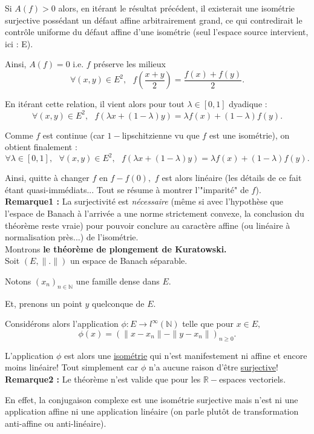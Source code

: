 Si $A(f)>0$ alors, en itérant le résultat précédent, il existerait une isométrie surjective possédant un défaut affine arbitrairement grand, ce qui contredirait le contrôle uniforme du défaut affine d'une isométrie (seul l'espace source intervient, ici : E).

Ainsi, $A(f)=0$ i.e. $f$ préserve les milieux $$\forall (x,y)\in E^{2},\mbox{ } f(\frac{x+y}{2})=\frac{f(x)+f(y)}{2}.$$

En itérant cette relation, il vient alors pour tout $\lambda\in[0,1]$ dyadique : $$\forall (x,y)\in E^{2},\mbox{ } f(\lambda x + (1-\lambda)y)=\lambda f(x)+(1-\lambda)f(y).$$

Comme $f$ est continue (car $1-$lipschitzienne vu que $f$ est une isométrie), on obtient finalement : $$\forall\lambda\in[0,1],\mbox{ }\forall (x,y)\in E^{2},\mbox{ } f(\lambda x + (1-\lambda)y)=\lambda f(x)+(1-\lambda)f(y).$$

Ainsi, quitte à changer $f$ en $f-f(0),$ $f$ est alors linéaire (les détails de ce fait étant quasi-immédiats... Tout se résume à montrer l'"imparité" de $f$).\\


\textbf{Remarque1 :} La surjectivité est \emph{nécessaire} (même si avec l'hypothèse que l'espace de Banach à l'arrivée a une norme strictement convexe, la conclusion du théorème reste vraie) pour pouvoir conclure au caractère affine (ou linéaire à normalisation près...) de l'isométrie.\\

Montrons \textbf{le théorème de plongement de Kuratowski.}\\

Soit $(E,\|.\|)$ un espace de Banach séparable.

Notons $(x_{n})_{n\in\mathbb{N}}$ une famille dense dans $E.$ 

Et, prenons un point $y$ quelconque de $E.$

Considérons alors l'application $\displaystyle \phi : E \rightarrow l^{\infty}(\mathbb{N})$ telle que pour $x\in E,$ $$\phi(x)=(\|x-x_{n}\|-\|y-x_{n}\|)_{n\geq 0}.$$

L'application $\phi$ est alors une \underline{isométrie} qui n'est manifestement ni affine et encore moins linéaire!
Tout simplement car $\phi$ n'a aucune raison d'être \underline{surjective}!\\

\textbf{Remarque2 : } Le théorème n'est valide que pour les $\mathbb{R}-$espaces vectoriels. 

En effet, la conjugaison complexe est une isométrie surjective mais n'est ni une application affine ni une application linéaire (on parle plutôt de transformation anti-affine ou anti-linéaire).   
